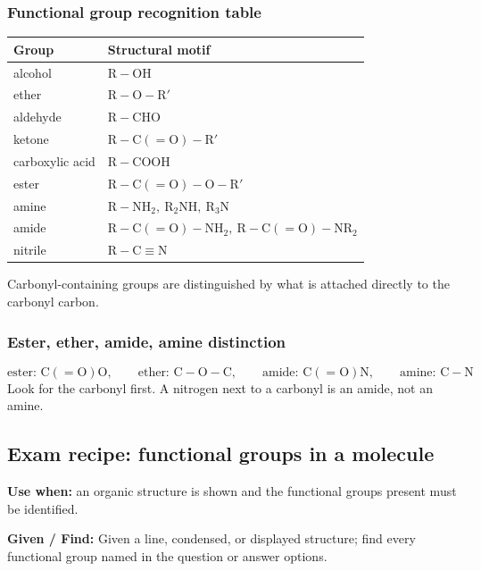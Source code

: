 \subsubsection{Functional group recognition table}
\begin{tabular}{@{}ll@{}}
\toprule
\textbf{Group} & \textbf{Structural motif}\\
\midrule
alcohol & \(\mathrm{R{-}OH}\)\\
ether & \(\mathrm{R{-}O{-}R'}\)\\
aldehyde & \(\mathrm{R{-}CHO}\)\\
ketone & \(\mathrm{R{-}C(=O){-}R'}\)\\
carboxylic acid & \(\mathrm{R{-}COOH}\)\\
ester & \(\mathrm{R{-}C(=O){-}O{-}R'}\)\\
amine & \(\mathrm{R{-}NH_2},\ \mathrm{R_2NH},\ \mathrm{R_3N}\)\\
amide & \(\mathrm{R{-}C(=O){-}NH_2},\ \mathrm{R{-}C(=O){-}NR_2}\)\\
nitrile & \(\mathrm{R{-}C{\equiv}N}\)\\
\bottomrule
\end{tabular}
Carbonyl-containing groups are distinguished by what is attached directly to the carbonyl carbon.

\subsubsection{Ester, ether, amide, amine distinction}
\begin{equation}
\label{eq:organic:heteroatom-distinction}
\text{ester: }\mathrm{C(=O)O}, \qquad
\text{ether: }\mathrm{C{-}O{-}C}, \qquad
\text{amide: }\mathrm{C(=O)N}, \qquad
\text{amine: }\mathrm{C{-}N}
\end{equation}
Look for the carbonyl first. A nitrogen next to a carbonyl is an amide, not an amine.

\subsection{Exam recipe: functional groups in a molecule}
\textbf{Use when:} an organic structure is shown and the functional groups present must be identified.

\textbf{Given / Find:} Given a line, condensed, or displayed structure; find every functional group named in the question or answer options.


